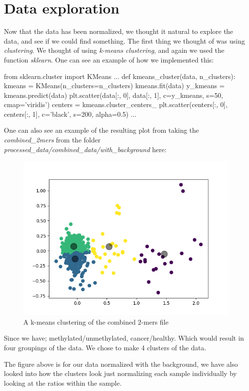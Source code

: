 \chapter{Data exploration}
Now that the data has been normalized, we thought it natural to explore the data, and see if we could find something. The first thing we thought of was using \textit{clustering}. We thought of using \textit{k-means clustering}, and again we used the function \textit{sklearn}. One can see an example of how we implemented this:

\begin{python}
from sklearn.cluster import KMeans
...
def kmeans_cluster(data, n_clusters):
    kmeans = KMeans(n_clusters=n_clusters)
    kmeans.fit(data)
    y_kmeans = kmeans.predict(data)
    plt.scatter(data[:, 0], data[:, 1], c=y_kmeans, s=50, cmap='viridis')
    centers = kmeans.cluster_centers_
    plt.scatter(centers[:, 0], centers[:, 1], c='black', s=200, alpha=0.5)
...
\end{python}

One can also see an example of the resulting plot from taking the \textit{combined\_2mers} from the folder \textit{processed\_data/combined\_data/with\_background} here:

\begin{figure}[H]
	\centering
	\includegraphics[width=0.7\linewidth]{../../figures/with_background/combined_2mers.png}
	\caption{A k-means clustering of the combined 2-mers file}
	\label{fig:kmeans0}
\end{figure}

Since we have; methylated/unmethylated, cancer/healthy. Which would result in four groupings of the data. We chose to make 4 clusters of the data.

The figure above is for our data normalized with the background, we have also looked into how the clusters look just normalizing each sample individually by looking at the ratios within the sample.

